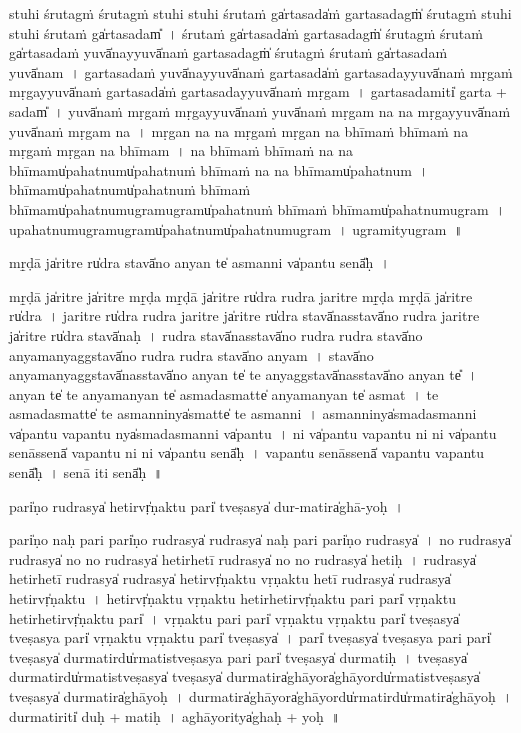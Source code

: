 \documentclass[parskip, DIV=14]{scrartcl}
\begin{document}
{stu॒hi śru॒tagṁ śru॒tagṁ stu॒hi stu॒hi śru॒taṁ ga̍rta॒sada̍ṁ garta॒sadagṁ̍ śru॒tagṁ stu॒hi stu॒hi śru॒taṁ ga̍rta॒sadam̎~।
śru॒taṁ ga̍rta॒sada̍ṁ garta॒sadagṁ̍ śru॒tagṁ śru॒taṁ ga̍rta॒sada॒ṁ yuvā̍na॒yyuvā̍naṁ garta॒sadagṁ̍ śru॒tagṁ śru॒taṁ ga̍rta॒sada॒ṁ yuvā̍nam~।
ga॒rta॒sada॒ṁ yuvā̍na॒yyuvā̍naṁ garta॒sada̍ṁ garta॒sada॒yyuvā̍naṁ mṛ॒gaṁ mṛ॒gayyuvā̍naṁ  garta॒sada̍ṁ garta॒sada॒yyuvā̍naṁ mṛ॒gam~।
ga॒rta॒sada॒miti̍ garta + sadam̎~।
yuvā̍naṁ mṛ॒gaṁ mṛ॒gayyuvā̍na॒ṁ yuvā̍naṁ mṛ॒gam na na mṛ॒gayyuvā̍na॒ṁ yuvā̍naṁ mṛ॒gam na~।
mṛ॒gan na na mṛ॒gaṁ mṛ॒gan na bhī॒maṁ bhī॒maṁ na mṛ॒gaṁ mṛ॒gan na bhī॒mam~।
na bhī॒maṁ bhī॒maṁ na na bhī॒mamu̍paha॒tnumu̍paha॒tnuṁ bhī॒maṁ na na bhī॒mamu̍paha॒tnum~।
bhī॒mamu̍paha॒tnumu̍paha॒tnuṁ bhī॒maṁ bhī॒mamu̍paha॒tnumu॒gramu॒gramu̍paha॒tnuṁ bhī॒maṁ bhī॒mamu̍paha॒tnumu॒gram~।
u॒pa॒ha॒tnumu॒gramu॒gramu̍paha॒tnumu̍paha॒tnumu॒gram~।
u॒gramityu॒gram~॥ 


mṛ̱ḍā ja̍ri॒tre ru̍dra॒ stavā̍no a॒nyan te̍ a॒smanni va̍pantu॒ senā̎ḥ~।

mṛ̱ḍā ja̍ri॒tre ja̍ri॒tre mṛ̱ḍa mṛ̱ḍā ja̍ri॒tre ru̍dra rudra jari॒tre mṛ̱ḍa mṛ̱ḍā ja̍ri॒tre ru̍dra~।
ja॒ri॒tre ru̍dra rudra jari॒tre ja̍ri॒tre ru̍dra॒ stavā̍na॒sstavā̍no rudra jari॒tre ja̍ri॒tre ru̍dra॒ stavā̍naḥ~।
ru॒dra॒ stavā̍na॒sstavā̍no rudra rudra॒ stavā̍no a॒nyama॒nyaggstavā̍no rudra rudra॒ stavā̍no a॒nyam~।
stavā̍no a॒nyama॒nyaggstavā̍na॒sstavā̍no a॒nyan te̍ te a॒nyaggstavā̍na॒sstavā̍no a॒nyan te̎~।
a॒nyan te̍ te a॒nyama॒nyan te̍ a॒smada॒smatte̍ a॒nyama॒nyan te̍ a॒smat~।
te॒ a॒smada॒smatte̍ te a॒smanninya̍smatte̍ te a॒smanni~।
a॒smanninya̍smada॒smanni va̍pantu vapantu॒ nya̍smada॒smanni va̍pantu~।
ni va̍pantu vapantu॒ ni ni va̍pantu॒ senā॒ssenā̍ vapantu॒ ni ni va̍pantu॒ senā̎ḥ~।
va॒pa॒ntu॒ senā॒ssenā̍ vapantu vapantu॒ senā̎ḥ~।
senā॒ iti॒ senā̎ḥ~॥ 

pari̍ṇo ru॒drasya̍ he॒tirvṛ̍ṇaktu॒ pari̍ tve॒ṣasya̍ dur-ma॒tira̍ghā॒-yoḥ~।

pari̍ṇo na॒ḥ pari॒ pari̍ṇo ru॒drasya̍ ru॒drasya̍ na॒ḥ pari॒ pari̍ṇo ru॒drasya̍~।
no॒ ru॒drasya̍ ru॒drasya̍ no no ru॒drasya̍ he॒tirhe॒tī ru॒drasya̍ no no ru॒drasya̍ he॒tiḥ~।
ru॒drasya̍ he॒tirhe॒tī ru॒drasya̍ ru॒drasya̍ he॒tirvṛ̍ṇaktu vṛṇaktu he॒tī ru॒drasya̍ ru॒drasya̍ he॒tirvṛ̍ṇaktu~।
he॒tirvṛ̍ṇaktu vṛṇaktu he॒tirhe॒tirvṛ̍ṇaktu॒ pari॒ pari̍ vṛṇaktu he॒tirhe॒tirvṛ̍ṇaktu॒ pari̍~।
vṛ॒ṇa॒ktu॒ pari॒ pari̍ vṛṇaktu vṛṇaktu॒ pari̍ tve॒ṣasya̍ tve॒ṣasya॒ pari̍ vṛṇaktu vṛṇaktu॒ pari̍ tve॒ṣasya̍~। %
pari̍ tve॒ṣasya̍ tve॒ṣasya॒ pari॒ pari̍ tve॒ṣasya̍ durma॒tirdu̍rma॒tistve॒ṣasya॒ pari॒ pari̍ tve॒ṣasya̍ durma॒tiḥ~।
tve॒ṣasya̍ durma॒tirdu̍rma॒tistve॒ṣasya̍ tve॒ṣasya̍ durma॒tira̍ghā॒yora̍ghā॒yordu̍rma॒tistve॒ṣasya̍ tve॒ṣasya̍ durma॒tira̍ghā॒yoḥ~। %
du॒rma॒tira̍ghā॒yora̍ghā॒yordu̍rma॒tirdu̍rma॒tira̍ghā॒yoḥ~। %
du॒rma॒tiriti̍ duḥ  + ma॒tiḥ~।
a॒ghā॒yoritya̍ghaḥ + yoḥ~॥ %

}
\end{document}
